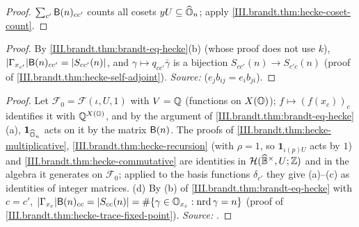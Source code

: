 \begin{theorem}
\end{theorem}
\begin{proof}
$\sum_{c'}\mathsf{B}(n)_{cc'}$ counts all cosets $yU\subseteq\widehat{\mathbb{O}}_n$; apply \cref{III.brandt.thm:hecke-coset-count}.
\end{proof}

\begin{theorem}
\end{theorem}
\begin{proof}
By \cref{III.brandt.thm:brandt-eq-hecke}(b) (whose proof does not use $k$), $\lvert\Gamma_{x_{c'}}\rvert\mathsf{B}(n)_{cc'}=\lvert S_{cc'}(n)\rvert$, and
$\gamma\mapsto q_{cc'}\bar\gamma$ is a bijection $S_{cc'}(n)\to S_{c'c}(n)$ (proof of \cref{III.brandt.thm:hecke-self-adjoint}). \emph{Source:}
\cite[Lemma~2.18]{Piz} ($e_jb_{ij}=e_ib_{ji}$).
\end{proof}

\begin{corollary}[relations]
\end{corollary}
\begin{proof}
Let $\mathcal F_0=\mathcal F(\iota,U,1)$ with $V=\mathbb{Q}$ (functions on $X(\mathbb{O})$); $f\mapsto(f(x_c))_c$ identifies it with $\mathbb{Q}^{X(\mathbb{O})}$, and by the argument of
\cref{III.brandt.thm:brandt-eq-hecke}(a), $\mathbf 1_{\widehat{\mathbb{O}}_n}$ acts on it by the matrix $\mathsf{B}(n)$. The proofs of \cref{III.brandt.thm:hecke-multiplicative},
\cref{III.brandt.thm:hecke-recursion} (with $\rho=1$, so $\mathbf 1_{\iota(p)U}$ acts by $1$) and \cref{III.brandt.thm:hecke-commutative} are identities in
$\mathcal H(\widehat{\mathbb{B}}^\times,U;\mathbb{Z})$ and in the algebra it generates on $\mathcal F_0$; applied to the basis functions $\delta_{c'}$ they give (a)--(c) as identities of integer
matrices. (d) By (b) of \cref{III.brandt.thm:brandt-eq-hecke} with $c=c'$, $\lvert\Gamma_{x_c}\rvert\mathsf{B}(n)_{cc}=\lvert S_{cc}(n)\rvert=\#\{\gamma\in\mathbb{O}_{x_c}:\operatorname{nrd}\gamma=n\}$
(proof of \cref{III.brandt.thm:hecke-trace-fixed-point}). \emph{Source:} \cite[Prop.~2.22]{Piz}.
\end{proof}


